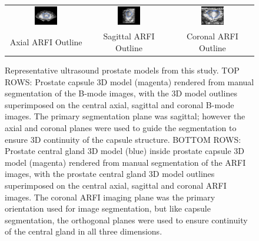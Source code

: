 \begin{figure}[htb!]
\vspace{3 mm}
\begin{tabular}{ccc}
\includegraphics[width=0.3\textwidth]{tyler/axial_ARFI.png} &
\includegraphics[width=0.3\textwidth]{tyler/sagittal_ARFI.png} &
\includegraphics[width=0.3\textwidth]{tyler/coronal_ARFI.png} \\
Axial ARFI Outline & Sagittal ARFI Outline & Coronal ARFI Outline \\
\end{tabular}
\caption{Representative ultrasound prostate models from this study.  TOP ROWS:
    Prostate capsule 3D model (magenta) rendered from manual segmentation of
    the B-mode images, with the 3D model outlines superimposed on the central
    axial, sagittal and coronal B-mode images.  The primary segmentation plane
    was sagittal; however the axial and coronal planes were used to guide the
    segmentation to ensure 3D continuity of the capsule structure.  BOTTOM
    ROWS: Prostate central gland 3D model (blue) inside prostate capsule 3D model (magenta) rendered from manual
    segmentation of the ARFI images, with the prostate central gland 3D model outlines superimposed on
    the central axial, sagittal and coronal ARFI images.  The coronal ARFI
    imaging plane was the primary orientation used for image segmentation, but
    like capsule segmentation, the orthogonal planes were used to ensure continuity of
    the central gland in all three dimensions.}
\label{fig:arfi_segs} 
\end{figure}
